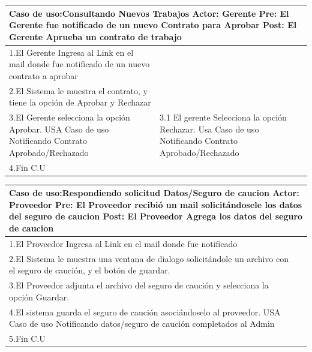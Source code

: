 \begin{longtable}{|p{}|p{}|}
    \hline
    \multicolumn{2}{|p{16cm}|}{
        \textbf{Caso de uso:}Consultando Nuevos Trabajos\newline
        \textbf{Actor:} Gerente\newline
        \textbf{Pre: }El Gerente fue notificado de un nuevo Contrato para Aprobar\newline
        \textbf{Post:}  El Gerente Aprueba un contrato de trabajo
    }\\
    \hline
    1.El Gerente Ingresa al Link en el mail donde fue notificado de un nuevo contrato a aprobar&    \\
    \hline
    2.El Sistema le muestra el contrato, y tiene la opción de Aprobar y Rechazar& \\
    \hline
    3.El Gerente selecciona la opción Aprobar. USA Caso de uso Notificando Contrato Aprobado/Rechazado& 3.1 El gerente Selecciona la opción Rechazar. Usa Caso de uso Notificando Contrato Aprobado/Rechazado\\
    \hline
    4.Fin C.U&\\
    \hline
\end{longtable}
\begin{longtable}{|p{}|p{}|}
    \hline
    \multicolumn{2}{|p{16cm}|}{
        \textbf{Caso de uso:}Respondiendo solicitud Datos/Seguro de caucion\newline
        \textbf{Actor:} Proveedor\newline
        \textbf{Pre: }El Proveedor recibió un mail solicitándosele los datos del seguro de caucion\newline
        \textbf{Post:}  El Proveedor Agrega los datos del seguro de caucion
    }\\
    \hline
    1.El Proveedor Ingresa al Link en el mail donde fue notificado&    \\
    \hline
    2.El Sistema le muestra una ventana de dialogo solicitándole un archivo con el seguro de caución, y el botón de guardar.& \\
    \hline
    3.El Proveedor adjunta el archivo del seguro de caución y selecciona la opción Guardar. &\\
    \hline
    4.El sistema guarda el seguro de caución asociándoselo al proveedor. USA Caso de uso Notificando datos/seguro de caución completados al Admin&\\
    \hline
    5.Fin C.U&\\
    \hline
\end{longtable}

